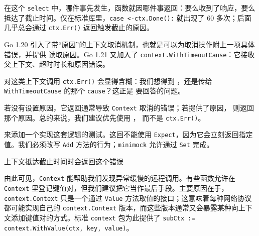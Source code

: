 在这个 \texttt{select} 中，哪件事先发生，函数就因哪件事返回：要么收到了响应，要么抵达了截止时间。仅在标准库里，\texttt{case <-ctx.Done():} 就出现了 60 多次；后面几乎总会通过 \texttt{ctx.Err()} 返回触发截止的原因。

Go 1.20 引入了带“原因”的上下文取消机制，也就是可以为取消操作附上一项具体错误，并提供  读取原因。Go 1.21 又加入了 \texttt{context.WithTimeoutCause}：它接收父上下文、超时时长和原因错误。

对这类上下文调用 \texttt{ctx.Err()} 会显得含糊：我们想得到
，还是传给 \texttt{WithTimeoutCause} 的那个
\texttt{cause}？这正是  要回答的问题。

若没有设置原因，它返回通常导致 \texttt{Context} 取消的错误；若提供了原因，
则返回那个原因。总的来说，我们建议优先使用 ，
而不是 \texttt{ctx.Err()}。

来添加一个实现这套逻辑的测试。这回不能使用 \texttt{Expect}，因为它会立刻返回指定值。我们必须改写 \texttt{Add} 方法的行为；\texttt{minimock} 允许通过 \texttt{Set} 完成。


\begin{codeannotations}
\item 上下文抵达截止时间时会返回这个错误
\end{codeannotations}

由此可见，\texttt{Context} 能帮助我们发现异常缓慢的远程调用。有些函数允许在 \texttt{Context} 里登记键值对，但我们建议把它当作最后手段。主要原因在于，\texttt{context.Context} 只是一个通过 \texttt{Value} 方法取值的接口；这意味着每种网络协议都可能实现自己的 \texttt{context.Context} 版本，而这些版本通常又会暴露某种向上下文添加键值对的方式。标准 \texttt{context} 包为此提供了 \texttt{subCtx := context.WithValue(ctx, key, value)}。

